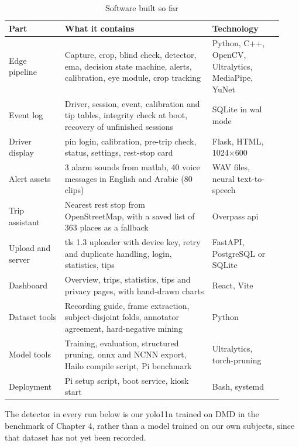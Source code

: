 \begin{table}[htbp]
\centering
\caption{Software built so far}
\label{tab:built}
\footnotesize
\setlength{\tabcolsep}{3pt}
\renewcommand{\arraystretch}{1.15}
\begin{tabular}{|p{0.190\linewidth}|p{0.500\linewidth}|p{0.240\linewidth}|}
\hline
\textbf{Part} & \textbf{What it contains} & \textbf{Technology} \\
\hline
Edge pipeline & Capture, crop, blind check, detector, \gls{ema}, decision state machine, alerts, calibration, eye module, crop tracking & Python, C++, OpenCV, Ultralytics, MediaPipe, YuNet \\
\hline
Event log & Driver, session, event, calibration and tip tables, integrity check at boot, recovery of unfinished sessions & SQLite in \gls{wal} mode \\
\hline
Driver display & \gls{pin} login, calibration, pre-trip check, status, settings, rest-stop card & Flask, HTML, 1024$\times$600 \\
\hline
Alert assets & 3 alarm sounds from \gls{matlab}, 40 voice messages in English and Arabic (80 clips) & WAV files, neural text-to-speech \\
\hline
Trip assistant & Nearest rest stop from OpenStreetMap, with a saved list of 363 places as a fallback & Overpass \gls{api} \\
\hline
Upload and server & \gls{tls} 1.3 uploader with device key, retry and duplicate handling, login, statistics, tips & FastAPI, PostgreSQL or SQLite \\
\hline
Dashboard & Overview, trips, statistics, tips and privacy pages, with hand-drawn charts & React, Vite \\
\hline
Dataset tools & Recording guide, frame extraction, subject-disjoint folds, annotator agreement, hard-negative mining & Python \\
\hline
Model tools & Training, evaluation, structured pruning, \gls{onnx} and NCNN export, Hailo compile script, Pi benchmark & Ultralytics, torch-pruning \\
\hline
Deployment & Pi setup script, boot service, kiosk start & Bash, systemd \\
\hline
\end{tabular}
\end{table}

The detector in every run below is our \gls{yolo}11n trained on DMD in the benchmark of Chapter 4, rather than a model trained on our own subjects, since that dataset has not yet been recorded.

